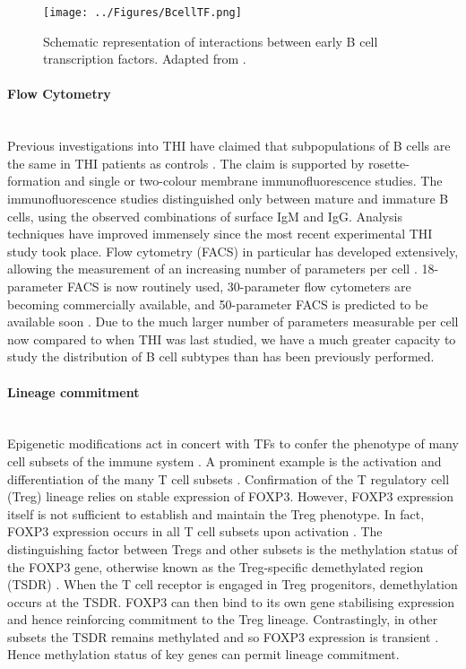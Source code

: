 \documentclass[12pt]{article}
\begin{document}
			
			\begin{figure}
				\centering
				\texttt{[image: ../Figures/BcellTF.png]}
				\caption{Schematic representation of interactions between early B cell transcription factors. Adapted from \citet{Choukrallah14}.}
				\label{fig:TFBcell}
			\end{figure}
		
		
			\paragraph{Flow Cytometry}
			~\\
			Previous investigations into THI have claimed that subpopulations of B cells are the same in THI patients as controls \citep{Tiller78,Stiemh80,Siegel81,Buckley83,Fiorilli86,Dressler89}. 
			The claim is supported by rosette-formation and single or two-colour membrane immunofluorescence studies. 
			The immunofluorescence studies distinguished only between mature and immature B cells, using the observed combinations of surface IgM and IgG. 
			Analysis techniques have improved immensely since the most recent experimental THI study took place.
			Flow cytometry (FACS) in particular has developed extensively, allowing the measurement of an increasing number of parameters per cell \citep{Saeys16}.
			18-parameter FACS is now routinely used, 30-parameter flow cytometers are becoming commercially available, and 50-parameter FACS is predicted to be available soon \citep{Saeys16}.
			Due to the much larger number of parameters measurable per cell now compared to when THI was last studied, we have a much greater capacity to study the distribution of B cell subtypes than has been previously performed.
			
			
		\paragraph{Lineage commitment}
		~\\
			Epigenetic modifications act in concert with TFs to confer the phenotype of many cell subsets of the immune system \citep{Lara14,Zan15,Mercer11}. 
			A prominent example is the activation and differentiation of the many T cell subsets \citep{Begin14, Zeng13}. 
			Confirmation of the T regulatory cell (Treg) lineage relies on stable expression of FOXP3.
			However, FOXP3 expression itself is not sufficient to establish and maintain the Treg phenotype.
			In fact, FOXP3 expression occurs in all T cell subsets upon activation \citep{Ohkura13,Polansky08}.
			The distinguishing factor between Tregs and other subsets is the methylation status of the FOXP3 gene, otherwise known as the Treg-specific demethylated region (TSDR) \cite{Shimazu16}.
			When the T cell receptor is engaged in Treg progenitors, demethylation occurs at the TSDR. 
			FOXP3 can then bind to its own gene stabilising expression and hence reinforcing commitment to the Treg lineage.
			Contrastingly, in other subsets the TSDR remains methylated and so FOXP3 expression is transient \citep{Ohkura13}.
			Hence methylation status of key genes can permit lineage commitment. 
			
\end{document}
